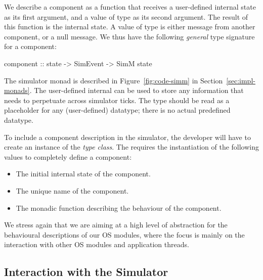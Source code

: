 We describe a component as a function that receives a user-defined internal state as its first argument, and a value of type  as its second argument.
The result of this function is the internal state.
A value of type  is either message from another component, or a null message.
We thus have the following \emph{general} type signature for a component:
\begin{code}
component :: state -> SimEvent -> SimM state
\end{code}

The simulator monad  is described in Figure~\ref{fig:code-simm} in Section~\ref{sec:impl-monads}.
The user-defined internal  can be used to store any information that needs to perpetuate across simulator ticks.
The type  should be read as a placeholder for any (user-defined) datatype; there is no actual predefined  datatype.

To include a component description in the simulator, the developer will have to create an instance of the  \emph{type class}.
The  requires the instantiation of the following values to completely define a component:

\begin{itemize}
  \item The initial internal state of the component.
  \item The unique name of the component.
  \item The monadic function describing the behaviour of the component.
\end{itemize}

We stress again that we are aiming at a high level of abstraction for the behavioural descriptions of our OS modules, where the focus is mainly on the interaction with other OS modules and application threads.


\subsection{Interaction with the Simulator}

%
%

